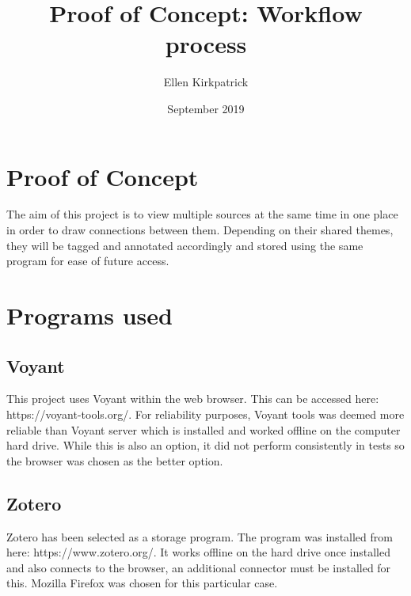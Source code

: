 \documentclass{article}
\title{Proof of Concept: Workflow process}
\author{Ellen Kirkpatrick }
\date{September 2019}
\begin{document}
\maketitle

\section{Proof of Concept}
The aim of this project is to view multiple sources at the same time in one place in order to draw connections between them. Depending on their shared themes, they will be tagged and annotated accordingly and stored using the same program for ease of future access.

\section{Programs used}
\subsection{Voyant}
This project uses Voyant within the web browser. This can be accessed here: https://voyant-tools.org/. For reliability purposes, Voyant tools was deemed more reliable than Voyant server which is installed and worked offline on the computer hard drive. While this is also an option, it did not perform consistently in tests so the browser was chosen as the better option.
\subsection{Zotero}
Zotero has been selected as a storage program. The program was installed from here: https://www.zotero.org/. It works offline on the hard drive once installed and also connects to the browser, an additional connector must be installed for this. Mozilla Firefox was chosen for this particular case. 
\end{document}
